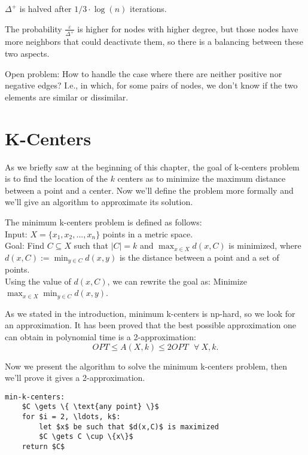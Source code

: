 \begin{thm}
    $\Delta^+$ is halved after $1/3 \cdot \log(n)$ iterations.
\end{thm}

\obs The probability $\frac{\varepsilon}{\Delta^+}$ is higher for nodes with higher degree, but those nodes have more neighbors that could deactivate them, so there is a balancing between these two aspects.

Open problem: How to handle the case where there are neither positive nor negative edges? I.e., in which, for some pairs of nodes, we don't know if the two elements are similar or dissimilar.


\section{K-Centers}\label{sec:k-centers}

As we briefly saw at the beginning of this chapter, the goal of k-centers problem is to find the location of the $k$ centers as to minimize the maximum distance between a point and a center. Now we'll define the problem more formally and we'll give an algorithm to approximate its solution.

\begin{defn}\label{def:k-centers}
    The minimum k-centers problem is defined as follows:\\
    Input: $X = \{x_1, x_2, ..., x_n\}$ points in a metric space.\\
    Goal: Find $C \subseteq X$ such that $|C| = k$ and $\max_{x \in X} d(x,C)$ is minimized, where $d(x,C) := \min_{y \in C} d(x,y)$ is the distance between a point and a set of points.\\
    Using the value of $d(x,C)$, we can rewrite the goal as: Minimize $\max_{x \in X} \min_{y \in C} d(x, y)$.
\end{defn}

As we stated in the introduction, minimum k-centers is np-hard, so we look for an approximation. It has been proved that the best possible approximation one can obtain in polynomial time is a 2-approximation: $$OPT \leq A(X,k) \leq 2 OPT \ \ \ \forall\ X,k.$$

Now we present the algorithm to solve the minimum k-centers problem, then we'll prove it gives a 2-approximation.

\begin{lstlisting}[caption={Minimum k-centers}, label={lst:min-k-centers}]
min-k-centers:
    $C \gets \{ \text{any point} \}$
    for $i = 2, \ldots, k$:
        let $x$ be such that $d(x,C)$ is maximized
        $C \gets C \cup \{x\}$
    return $C$
\end{lstlisting}

